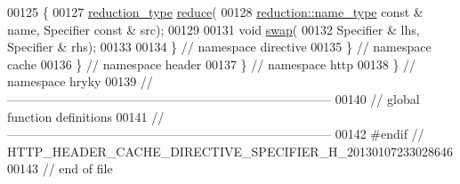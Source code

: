 \begin{DoxyCode}
00125 \{
00127     \hyperlink{namespacehryky_a343a9a4c36a586be5c2693156200eadc}{reduction_type} \hyperlink{namespacehryky_1_1http_a08fc36a78a8e2908140fcd102829a566}{reduce}(
00128         \hyperlink{namespacehryky_1_1reduction_ac686c30a4c8d196bbd0f05629a6b921f}{reduction::name_type} \textcolor{keyword}{const} & name, Specifier \textcolor{keyword}{const} & src);
00129 
00131     \textcolor{keywordtype}{void} \hyperlink{namespacehryky_1_1http_a38e62595ad532d18fbc65ceb61973aec}{swap}(
00132         Specifier & lhs, Specifier & rhs);
00133 
00134 \} \textcolor{comment}{// namespace directive}
00135 \} \textcolor{comment}{// namespace cache}
00136 \} \textcolor{comment}{// namespace header}
00137 \} \textcolor{comment}{// namespace http}
00138 \} \textcolor{comment}{// namespace hryky}
00139 \textcolor{comment}{//
      ------------------------------------------------------------------------------}
00140 \textcolor{comment}{// global function definitions}
00141 \textcolor{comment}{//
      ------------------------------------------------------------------------------}
00142 \textcolor{preprocessor}{#endif // HTTP\_HEADER\_CACHE\_DIRECTIVE\_SPECIFIER\_H\_20130107233028646}
00143 \textcolor{preprocessor}{}\textcolor{comment}{// end of file}
\end{DoxyCode}
